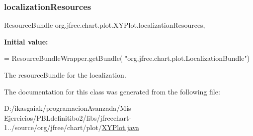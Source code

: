 \subsubsection{\texorpdfstring{localization\+Resources}{localizationResources}}
{\footnotesize\ttfamily Resource\+Bundle org.\+jfree.\+chart.\+plot.\+X\+Y\+Plot.\+localization\+Resources\hspace{0.3cm}{\ttfamily [static]}, {\ttfamily [protected]}}

{\bfseries Initial value\+:}
\begin{DoxyCode}
= ResourceBundleWrapper.getBundle(
                    \textcolor{stringliteral}{"org.jfree.chart.plot.LocalizationBundle"})
\end{DoxyCode}
The resource\+Bundle for the localization. 

The documentation for this class was generated from the following file\+:\begin{DoxyCompactItemize}
\item 
D\+:/ikasgaiak/programacion\+Avanzada/\+Mis Ejercicios/\+P\+B\+Ldefinitibo2/libs/jfreechart-\/1../source/org/jfree/chart/plot/\mbox{\hyperlink{_x_y_plot_8java}{X\+Y\+Plot.\+java}}\end{DoxyCompactItemize}
